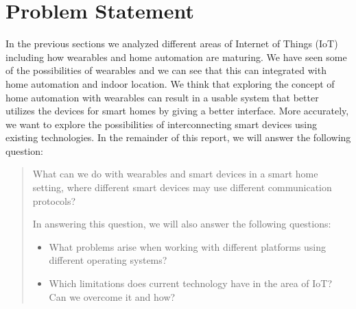 \section{Problem Statement}
In the previous sections we analyzed different areas of Internet of Things (IoT) including how wearables and home automation are maturing. 
We have seen some of the possibilities of wearables and we can see that this can integrated with home automation and indoor location.
We think that exploring the concept of home automation with wearables can result in a usable system that better utilizes the devices for smart homes by giving a better interface. 
More accurately, we want to explore the possibilities of interconnecting smart devices using existing technologies.
In the remainder of this report, we will answer the following question:
\begin{framed}
    \begin{quote}
        What can we do with wearables and smart devices in a smart home setting, where different smart devices may use different communication protocols?
        
        In answering this question, we will also answer the following questions:
        \begin{itemize}
            \item What problems arise when working with different platforms using different operating systems?
            \item Which limitations does current technology have in the area of IoT? Can we overcome it and how? 
           \end{itemize} 
    \end{quote}
\end{framed}


%

